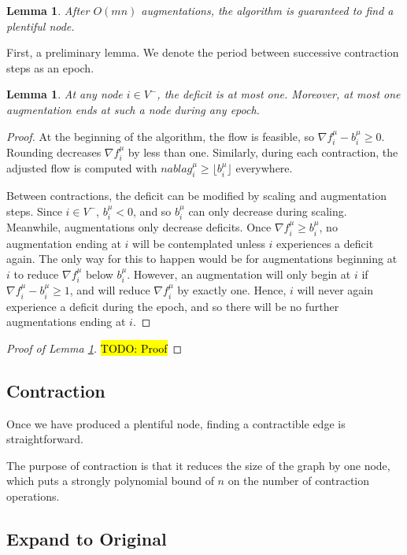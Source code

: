 \documentclass[11pt]{article}
\newtheorem{lemma}[theorem]{Lemma}
\theoremstyle{definition}
\theoremstyle{definition}
\newcommand{\fu}{f^{\mu}}
\newcommand{\nfiu}{\nabla \fu_i}
\newcommand{\biu}{b_{i}^{\mu}}
\newcommand{\todo}[1]{\hl{TODO: #1}}
\begin{document}
		\begin{lemma} \label{lem.num-aug}
			After $O(mn)$ augmentations, the algorithm is guaranteed to find a plentiful node.
		\end{lemma}
		First, a preliminary lemma. We denote the period between successive contraction
		steps as an epoch.
		\begin{lemma}
		At any node $i \in V^-$, the deficit is at most one. Moreover, at most one augmentation
		ends at such a node during any epoch.
		\end{lemma}
		\begin{proof}
			At the beginning of the algorithm, the flow is feasible, so $\nfiu - \biu \geq 0$.
			Rounding decreases $\nfiu$ by less than one. Similarly, during each contraction,
			the adjusted flow is computed with $nabla g_i^\mu \geq \lfloor \biu \rfloor$ everywhere.
			
			Between contractions, the deficit can be modified by scaling and augmentation steps.
			Since $i \in V^-$, $\biu < 0$, and so $\biu$ can only decrease during scaling.
			Meanwhile, augmentations only decrease deficits.
			Once $\nfiu \geq \biu$, no augmentation ending at $i$ will be contemplated unless $i$
			experiences a deficit again. The only way for this to happen would be for
			augmentations beginning at $i$ to reduce $\nfiu$ below $\biu$. However,
			an augmentation will only begin at $i$ if
			$\nfiu - \biu \geq 1$, and will reduce $\nfiu$ by exactly one. Hence, $i$ will
			never again experience a deficit during the epoch, and so there will be no further
			augmentations ending at $i$.
		\end{proof}
		
		\begin{proof}[Proof of Lemma \ref{lem.num-aug}] \todo{Proof}	
		\end{proof}


	\subsection{Contraction}

	Once we have produced a plentiful node, finding a contractible edge is straightforward. 

	The purpose of contraction is that it reduces the size of the graph by one node,
	which puts a strongly polynomial bound of $n$ on the number of contraction
	operations.
	\subsection{Expand to Original}
\end{document}
